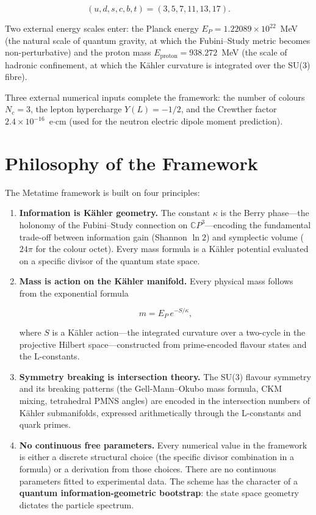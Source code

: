\begin{equation}
(u,d,s,c,b,t) = (3,5,7,11,13,17).
\label{eq:quark_primes_def}
\end{equation}

Two external energy scales enter: the Planck energy \(E_P = 1.22089\times
10^{22}\)~MeV (the natural scale of quantum gravity, at which the
Fubini--Study metric becomes non-perturbative) and the proton mass
\(E_{\text{proton}} = 938.272\)~MeV (the scale of hadronic confinement,
at which the K\"{a}hler curvature is integrated over the SU(3) fibre).

Three external numerical inputs complete the framework: the number of colours
\(N_c = 3\), the lepton hypercharge \(Y(L) = -1/2\), and the Crewther factor
\(2.4\times 10^{-16}\)~e\(\cdot\)cm (used for the neutron electric dipole
moment prediction).

\section{Philosophy of the Framework}

The Metatime framework is built on four principles:

\begin{enumerate}

\item \textbf{Information is K\"{a}hler geometry.}
The constant \(\kappa\) is the Berry phase---the holonomy of the
Fubini--Study connection on \(\mathbb{C}P^{3}\)---encoding the fundamental
trade-off between information gain (Shannon \(\ln 2\)) and symplectic volume
(\(24\pi\) for the colour octet).  Every mass formula is a K\"{a}hler
potential evaluated on a specific divisor of the quantum state space.

\item \textbf{Mass is action on the K\"{a}hler manifold.}
Every physical mass follows from the exponential formula

\[
m = E_P \, e^{-S/\kappa},
\]

where \(S\) is a K\"{a}hler action---the integrated curvature over a
two-cycle in the projective Hilbert space---constructed from prime-encoded
flavour states and the L-constants.

\item \textbf{Symmetry breaking is intersection theory.}
The SU(3) flavour symmetry and its breaking patterns (the Gell-Mann--Okubo
mass formula, CKM mixing, tetrahedral PMNS angles) are encoded in the
intersection numbers of K\"{a}hler submanifolds, expressed arithmetically
through the L-constants and quark primes.

\item \textbf{No continuous free parameters.}
Every numerical value in the framework is either a discrete structural
choice (the specific divisor combination in a formula) or a derivation from
those choices.  There are no continuous parameters fitted to experimental
data.  The scheme has the character of a
\textbf{quantum information-geometric bootstrap}: the state space geometry
dictates the particle spectrum.
\end{enumerate}

